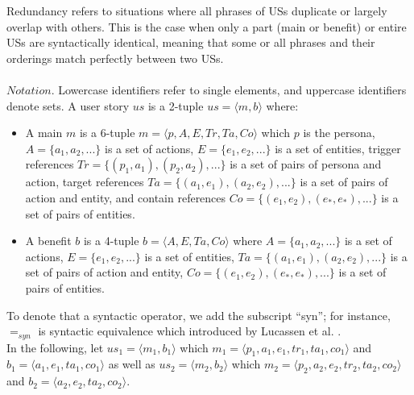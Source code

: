 \begin{definition}
	Redundancy refers to situations where all phrases of USs duplicate or largely overlap with others. This is the case when only a part (main or benefit) or entire USs are syntactically identical, meaning that some or all phrases and their orderings match perfectly between two USs. \\\\
	$Notation$. Lowercase identifiers refer to single elements, and uppercase identifiers denote sets. A user story $us$ is a 2-tuple $us = \langle m,b\rangle $ where:
	\begin{itemize}
		\item A main $m$ is a 6-tuple $m = \langle p,A,E,Tr,Ta,Co\rangle $ which $p$ is the persona, $A = \{ a_1,a_2,...\} $ is a set of actions, $E = \{e_1,e_2,...\}$ is a set of entities, trigger references $Tr = \{(p_1,a_1),(p_2,a_2),...\}$ is a set of pairs of persona and action, target references $Ta = \{(a_1,e_1),(a_2,e_2),...\}$ is a set of pairs of action and entity, and contain references $Co = \{ (e_1,e_2),(e_*,e_*),... \}$ is a set of pairs of entities.
		
		\item A benefit $b$ is a 4-tuple $b = \langle A,E,Ta,Co\rangle $ where $A = \{ a_1,a_2,...\} $ is a set of actions, $E = \{e_1,e_2,...\}$ is a set of entities,  $Ta = \{(a_1,e_1),(a_2,e_2),...\}$ is a set of pairs of action and entity, $Co = \{ (e_1,e_2),(e_*,e_*),... \}$ is a set of pairs of entities.
	\end{itemize}
	To denote that a syntactic operator, we add the subscript
	“syn”; for instance, $=_{syn}$ is syntactic equivalence which introduced by Lucassen et al. \cite{lucassen2016improving}.\\ In the following, let $us_1 = \langle m_1,b_1\rangle $ which $m_1 = \langle p_1,a_1,e_1,tr_1,ta_1,co_1 \rangle$ and $b_1 = \langle a_1,e_1,ta_1,co_1 \rangle$ as well as $us_2 = \langle m_2,b_2\rangle$ which $m_2 = \langle p_2,a_2,e_2,tr_2,ta_2,co_2 \rangle$ and $b_2 = \langle a_2,e_2,ta_2,co_2 \rangle$.
	

\end{definition}
